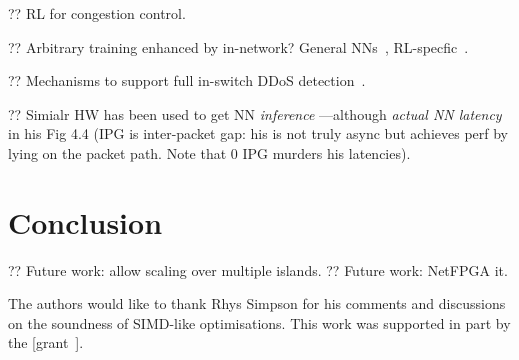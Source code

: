 \documentclass[sigconf,natbib=false]{acmart}
\begin{document}
?? RL for congestion control. ~\parencite{DBLP:journals/corr/abs-1910-04054}

?? Arbitrary training enhanced by in-network? General NNs~\parencite{DBLP:conf/micro/LiPAYQPWSEK18}, RL-specfic~\parencite{DBLP:conf/isca/LiLYCSH19}.

?? Mechanisms to support full in-switch DDoS detection~\cite{tnms-ddos-victim-ident}.

?? Simialr HW has been used to get NN \emph{inference} \textcite{langlet-ml-netronome}---although \emph{actual NN latency} in his Fig 4.4 (IPG is inter-packet gap: his is not truly async but achieves perf by lying on the packet path. Note that 0 IPG murders his latencies).

\section{Conclusion}

?? Future work: allow scaling over multiple islands.
?? Future work: NetFPGA it.

\begin{acks}
	The authors would like to thank Rhys Simpson for his comments and discussions on the soundness of SIMD-like optimisations.
	This work was supported in part by the  [grant~].
\end{acks}
	
%
%
\printbibliography
\end{document}
